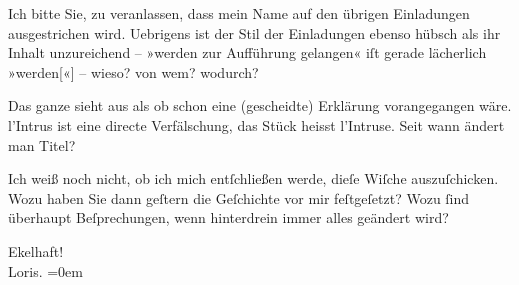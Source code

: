 \pstart
           Ich bitte Sie, zu veranlassen, dass mein Name auf den übrigen Einladungen
               ausgestrichen wird. Uebrigens ist der Stil der Einladungen ebenso hübsch als ihr
               Inhalt unzureichend – »werden zur Aufführung gelangen« iſt gerade lächerlich
                  »werden{[}«{]} – wieso? von wem? wodurch?\pend
           
\pstart
           Das ganze sieht aus als ob schon eine (gescheidte) Erklärung vorangegangen wäre. l’Intrus ist eine directe Verfälschung, das Stück
               heisst l’Intruse. {\pb}Seit wann ändert man Titel?\pend
           
\pstart
           Ich weiß noch nicht, ob ich mich entſchließen werde, dieſe Wiſche auszuſchicken. Wozu
               haben Sie dann geſtern die Geſchichte vor mir feſtgeſetzt? Wozu ſind überhaupt
               Beſprechungen, wenn hinterdrein immer alles geändert wird?\pend
           
\pstart
           Ekelhaft!{\\[\baselineskip]}\spacefill\mbox{Loris.}\pend
           \leftskip=0em{}\endnumbering{}  
      